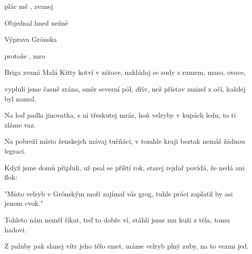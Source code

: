 

\zs
{} plác mě  , zvanej 


Objednal hned   nežně 

\ks

\zr
Výprava   Grónska  

protože  ,  mro
\kr

\zs
Briga zvaná Malá Kitty kotví v zátoce,
nakládaj se sudy s rumem, maso, ovoce,

vypluli jsme časně zrána, směr severní pól,
dřív, než přístav zmizel z očí, každej byl namol.
\ks

\zr  \kr

\zs
Na loď padla jinovatka, s ní třeskutej mráz,
hoň velryby v kupách ledu, to ti zláme vaz.

Na pobreží místo ženskejch mávaj tučňáci,
v tomhle kraji beztak nemáš žádnou legraci.
\ks

\zr  \kr

\zs
Když jsme domů připluli, už psal se příští rok,
starej rejdař povídá, že nedá ani flok:

"Místo velryb v Grónským moři zajímal vás grog,
tuhle práci zaplatil by asi jenom cvok."
\ks

\zr  \kr

\zs
Tohleto nám neměl říkat, teď to dobře ví,
stáhli jsme mu kuži z těla, tomu hadovi.

Z paluby pak slanej vítr jeho tělo smet,
máme velryb plný zuby, na to vezmi jed.
\ks

\zr  \kr

\kp
